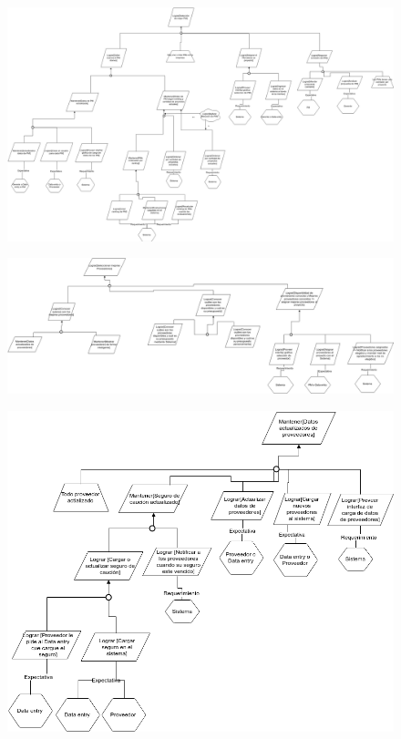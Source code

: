 \begin{figure}[H]
    \centering
    \includegraphics[width=8in, keepaspectratio, angle=90]{imagenes/objetivos-seleccion-mejor-pm.png}
\end{figure}

\begin{figure}[H]
    \centering
    \includegraphics[width=8in, keepaspectratio, angle=90]{imagenes/objetivos-seleccion-mejor-proveedor-principal.png}
\end{figure}

\begin{figure}[H]
    \centering
    \includegraphics[width=\textwidth]{imagenes/objetivos-seleccion-mejor-proveedor-1.png}
\end{figure}

